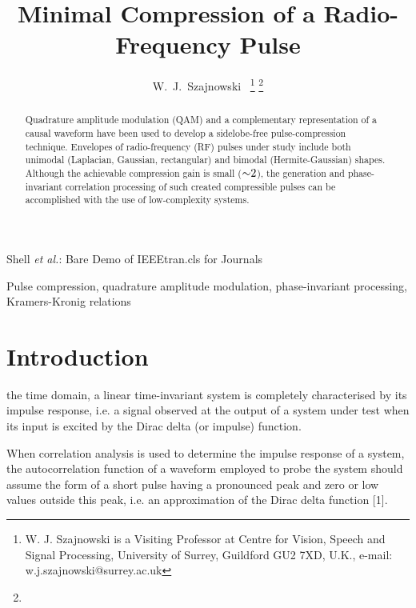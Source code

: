 \documentclass[journal]{IEEEtran}
\begin{document}
\title{Minimal Compression of a Radio-Frequency Pulse} 
\author{W.~J.~Szajnowski~\IEEEmembership{}
        {}%
\thanks{W. J. Szajnowski is a Visiting Professor at %
	Centre for Vision, Speech and Signal Processing, University of Surrey, Guildford GU2 7XD, U.K., e-mail: w.j.szajnowski@surrey.ac.uk}%
\thanks{}
}

\markboth{ }%
{Shell \MakeLowercase{\textit{et al.}}: Bare Demo of IEEEtran.cls for Journals}

\maketitle

\begin{abstract}
\boldmath
 Quadrature amplitude modulation (QAM) and a complementary representation of a causal waveform have been used to develop a sidelobe-free pulse-compression technique. Envelopes of radio-frequency (RF) pulses under study include both unimodal (Laplacian, Gaussian, rectangular) and bimodal (Hermite-Gaussian) shapes. Although the achievable compression gain is small ($\sim\mspace{-5mu}2$), the generation and phase-invariant correlation processing of such created compressible pulses can be accomplished with the use of low-complexity systems. 
 
 \end{abstract}

\begin{IEEEkeywords}
 Pulse compression, quadrature amplitude modulation, phase-invariant processing, Kramers-Kronig relations 
\end{IEEEkeywords}

\IEEEpeerreviewmaketitle

\section{Introduction}
 the time domain, a linear time-invariant system is completely characterised by its impulse response, i.e. a signal observed at the output of a system under test when its input is excited by the Dirac delta (or impulse) function. 

When correlation analysis is used to determine the impulse response of a system, the autocorrelation function of a waveform employed to probe the system should assume the form of a short pulse having a pronounced peak and zero or low values outside this peak, i.e. an approximation of the Dirac delta function [1].
\end{document}
